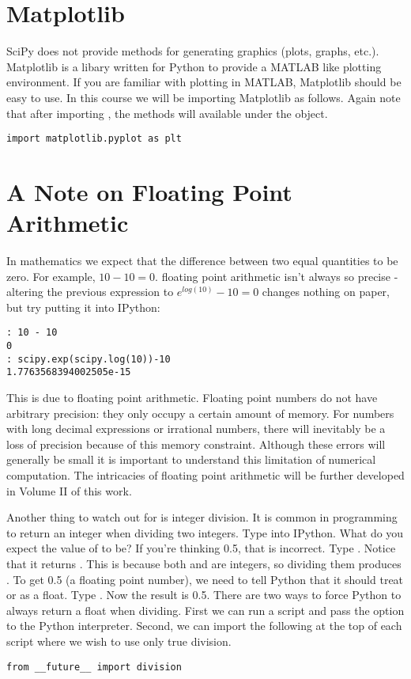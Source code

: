 \section*{Matplotlib}
SciPy does not provide methods for generating graphics (plots, graphs, etc.).  Matplotlib is a libary written for Python to provide a MATLAB like plotting environment.  If you are familiar with plotting in MATLAB, Matplotlib should be easy to use.  In this course we will be importing Matplotlib as follows.  Again note that after importing , the methods will available under the  object.
\begin{lstlisting}
import matplotlib.pyplot as plt
\end{lstlisting}

\section*{A Note on Floating Point Arithmetic}
In mathematics we expect that the difference between two equal quantities to be zero.  For example, $10 - 10 = 0$.  floating point arithmetic isn't always so precise - altering the previous expression to $e^{log(10)} - 10 = 0$ changes nothing on paper, but try putting it into IPython:

\begin{lstlisting}
: 10 - 10
0
: scipy.exp(scipy.log(10))-10
1.7763568394002505e-15
\end{lstlisting}

This is due to floating point arithmetic. Floating point numbers do not have arbitrary precision: they only occupy a certain amount of memory.  For numbers with long decimal expressions or irrational numbers, there will inevitably be a loss of precision because of this memory constraint.  Although these errors will generally be small it is important to understand this limitation of numerical computation. The intricacies of floating point arithmetic will be further developed in Volume II of this work.

Another thing to watch out for is integer division.  It is common in programming to return an integer when dividing two integers.  Type  into IPython.  What do you expect the value of  to be?  If you're thinking 0.5, that is incorrect.  Type .  Notice that it returns .  This is because both  and  are integers, so dividing them produces .  To get 0.5 (a floating point number), we need to tell Python that it should treat  or  as a float.  Type .  Now the result is 0.5.
There are two ways to force Python to always return a float when dividing.  First we can run a script and pass the  option to the Python interpreter.  Second, we can import the following at the top of each script where we wish to use only true division.
\begin{lstlisting}
from __future__ import division
\end{lstlisting}


